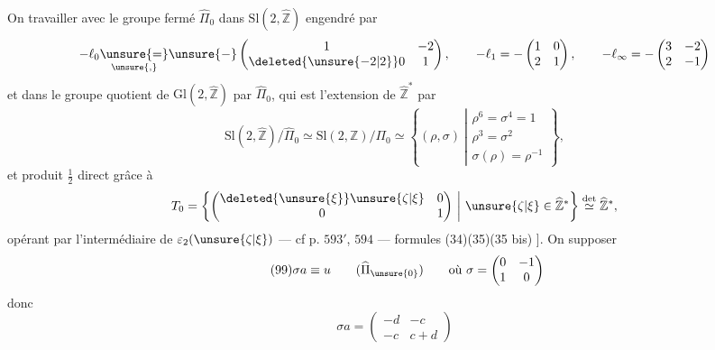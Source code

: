On  travailler avec le groupe fermé
$\widehat\Pi_0$ dans $\mathrm{Sl}(2,\widehat{\mathbb Z})$ engendré par
\[
\begin{gathered}
-\ell_0\underset{\unsure{,}}{\unsure{=}}\unsure{-}\begin{pmatrix}
1&-2\\\deleted{\unsure{-2|2}}0&1
\end{pmatrix},\qquad
-\ell_1=-\begin{pmatrix}1&0\\2&1\end{pmatrix},\qquad
-\ell_\infty=-\begin{pmatrix}3&-2\\2&-1\end{pmatrix}
\end{gathered}
\]
et dans le groupe quotient de
$\mathrm{Gl}(2,\widehat{\mathbb Z})$ par $\widehat\Pi_0$, qui est
 l'extension de
$\widehat{\mathbb Z}^{*}$ par
\[
\mathrm{Sl}(2,\widehat{\mathbb Z})/\widehat\Pi_0
\simeq\mathrm{Sl}(2,\mathbb Z)/\Pi_0
\simeq\left\{(\rho,\sigma)\ \left|\begin{array}{l}
\rho^6=\sigma^4=1\\
\rho^3=\sigma^2\\
\sigma(\rho)=\rho^{-1}
\end{array}\right.\right\},
\]
 et  produit $\frac12$ direct grâce à
\[
T_0=\left\{\begin{pmatrix}
\deleted{\unsure{\xi}}\unsure{\zeta|\xi}&0\\0&1
\end{pmatrix}\ \middle|\ \unsure{\zeta|\xi}\in\widehat{\mathbb Z}^{*}\right\}
\overset{\det}{\simeq}\widehat{\mathbb Z}^{*},
\]
opérant par l'intermédiaire de $\varepsilon_2(\unsure{\zeta|\xi})$
--- cf p. $593'$, $594$ --- formules (34)(35)(35 bis) ].
On  supposer
\[
\tag{99}
\sigma a\equiv u\qquad(\widehat\Pi_{\unsure{0}})
\qquad\text{où }\sigma=\begin{pmatrix}0&-1\\1&0\end{pmatrix}
\]
donc
\[
\tag{100}
\sigma a=\begin{pmatrix}-d&-c\\-c&c+d\end{pmatrix}
\]

